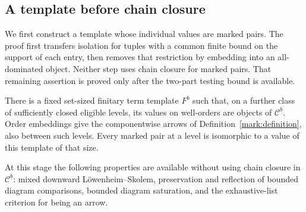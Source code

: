 \subsection{A template before chain closure}

We first construct a template whose individual values are marked
pairs.  The proof first transfers isolation for tuples with a common
finite bound on the support of each entry, then removes that restriction
by embedding into an all-dominated object.  Neither step uses chain
closure for marked pairs.  That remaining assertion is proved only after
the two-part testing bound is available.

\begin{lemma}
\label{mark:template}
There is a fixed set-sized finitary term template \(F^b\) such that,
on a further class of sufficiently closed eligible levels, its
values on well-orders are objects of \(\mathcal C^b\).  Order
embeddings give the componentwise arrows of Definition~\ref{mark:definition},
also between such levels.  Every marked pair at a level is isomorphic
to a value of this template of that size.

At this stage the following properties are available without using
chain closure in \(\mathcal C^b\): mixed downward
Löwenheim--Skolem, preservation and reflection of bounded diagram
comparisons, bounded diagram saturation, and the exhaustive-list
criterion for being an arrow.
\end{lemma}

